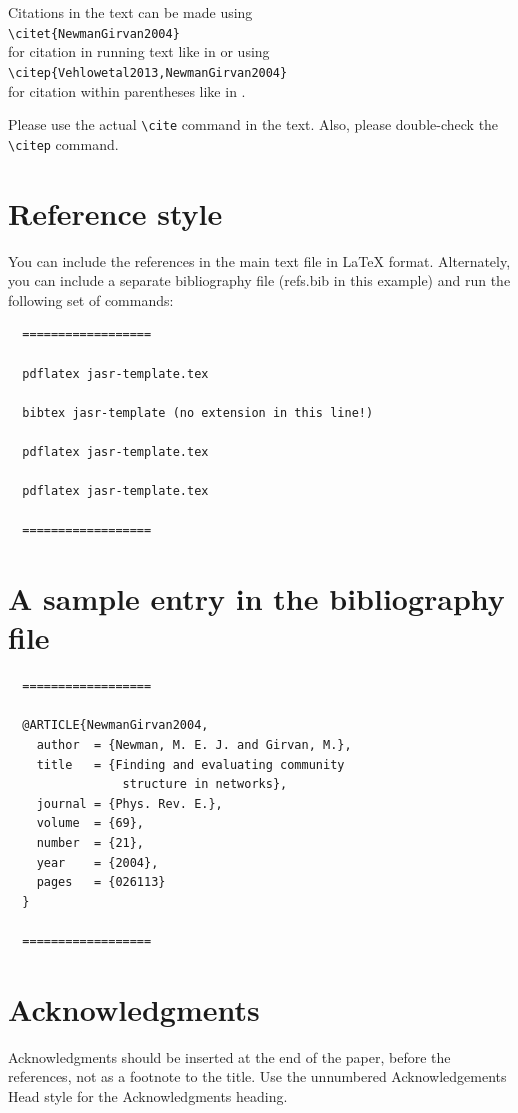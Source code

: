 \documentclass[times,authoryear]{elsarticle}
\begin{document}
Citations in the text can be made using\\[6pt]
\verb+\citet{NewmanGirvan2004}+\\[6pt]
for citation in running text like in
\citet{NewmanGirvan2004} or using\\[6pt]
\verb+\citep{Vehlowetal2013,NewmanGirvan2004}+\\[6pt]
for citation within parentheses like in
\citep{Vehlowetal2013,NewmanGirvan2004}.

Please use the actual \verb+\cite+ command in the text.
Also, please double-check the \verb+\citep+ command.

\section{Reference style}
You can include the references in the main text file in \LaTeX
format. Alternately, you can include a separate bibliography
file (refs.bib in this example) and run the following set of
commands:
\begin{verbatim}
  ==================

  pdflatex jasr-template.tex

  bibtex jasr-template (no extension in this line!)

  pdflatex jasr-template.tex

  pdflatex jasr-template.tex

  ==================
  \end{verbatim}

\section{A sample entry in the bibliography file}


\begin{verbatim}
  ==================

  @ARTICLE{NewmanGirvan2004,
    author  = {Newman, M. E. J. and Girvan, M.},
    title   = {Finding and evaluating community 
                structure in networks},
    journal = {Phys. Rev. E.},
    volume  = {69},
    number  = {21},
    year    = {2004},
    pages   = {026113}
  }

  ==================
\end{verbatim}

\section*{Acknowledgments}
Acknowledgments should be inserted at the end of the paper,
before the references, not as a footnote to the title. Use the
unnumbered Acknowledgements Head style for the Acknowledgments
heading.



\end{document}
